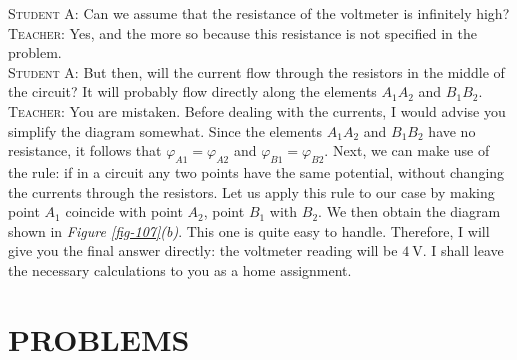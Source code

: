 \documentclass[a4paper,sfsidenotes]{tufte-book}
\begin{document}
\textsc{Student A:} Can we assume that the resistance of the voltmeter is infinitely high?
\\
\textsc{Teacher:} Yes, and the more so because this resistance is not specified in the problem.
\\
\textsc{Student A:} But then, will the current flow through the resistors in the middle of the circuit? It will probably flow directly along the elements $A_{1}A_{2}$ and $B_{1}B_{2}$.
\\
\textsc{Teacher:} You are mistaken. Before dealing with the currents, I would advise you simplify the diagram somewhat. Since the elements $A_{1}A_{2}$ and $B_{1}B_{2}$ have no resistance, it follows that $\varphi_{A1} = \varphi_{A2}$ and $\varphi_{B1} = \varphi_{B2}$. Next, we can make use of the rule: if in a circuit any two points have the same potential, without changing the currents through the resistors. Let us apply this rule to our case by making point $A_{1}$ coincide with point $A_{2}$, point $B_{1}$ with $B_{2}$. We then obtain the diagram shown in \emph{Figure \ref{fig-107}(b)}. This one is quite easy to handle. Therefore, I will give you the final answer directly: the voltmeter reading will be $\SI{4}{\volt}$. I shall leave the necessary calculations to you as a home assignment.

\section{PROBLEMS}
\label{sec-29-1}
\end{document}
